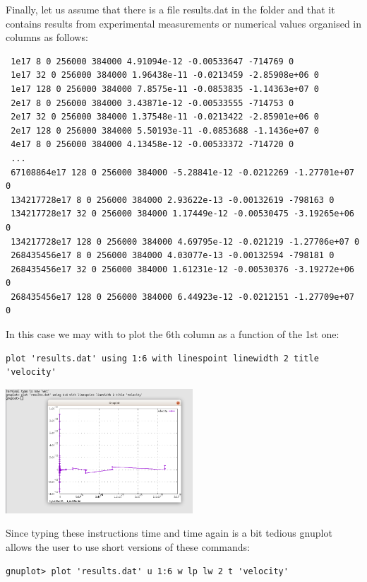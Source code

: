 Finally, let us assume that there is a file {\filenamefont results.dat} in the folder and that it contains 
results from experimental measurements or numerical values organised in columns as follows:
\begin{verbatim}
 1e17 8 0 256000 384000 4.91094e-12 -0.00533647 -714769 0
 1e17 32 0 256000 384000 1.96438e-11 -0.0213459 -2.85908e+06 0
 1e17 128 0 256000 384000 7.8575e-11 -0.0853835 -1.14363e+07 0
 2e17 8 0 256000 384000 3.43871e-12 -0.00533555 -714753 0
 2e17 32 0 256000 384000 1.37548e-11 -0.0213422 -2.85901e+06 0
 2e17 128 0 256000 384000 5.50193e-11 -0.0853688 -1.1436e+07 0
 4e17 8 0 256000 384000 4.13458e-12 -0.00533372 -714720 0
 ...
 67108864e17 128 0 256000 384000 -5.28841e-12 -0.0212269 -1.27701e+07 0
 134217728e17 8 0 256000 384000 2.93622e-13 -0.00132619 -798163 0
 134217728e17 32 0 256000 384000 1.17449e-12 -0.00530475 -3.19265e+06 0
 134217728e17 128 0 256000 384000 4.69795e-12 -0.021219 -1.27706e+07 0
 268435456e17 8 0 256000 384000 4.03077e-13 -0.00132594 -798181 0
 268435456e17 32 0 256000 384000 1.61231e-12 -0.00530376 -3.19272e+06 0
 268435456e17 128 0 256000 384000 6.44923e-12 -0.0212151 -1.27709e+07 0
\end{verbatim} 
In this case we may with to plot the 6th column as a function of the 1st one:
\begin{mdframed}[backgroundcolor=gray!10]
\begin{verbatim}
plot 'results.dat' using 1:6 with linespoint linewidth 2 title 'velocity'
\end{verbatim}
\end{mdframed}
\begin{center}
\includegraphics[width=7cm]{images/gnuplot/gnuplot4}
\end{center}
Since typing these instructions time and time again is a bit tedious gnuplot 
allows the user to use short versions of these commands:
\begin{mdframed}[backgroundcolor=gray!10]
\begin{verbatim}
gnuplot> plot 'results.dat' u 1:6 w lp lw 2 t 'velocity'
\end{verbatim}
\end{mdframed}
